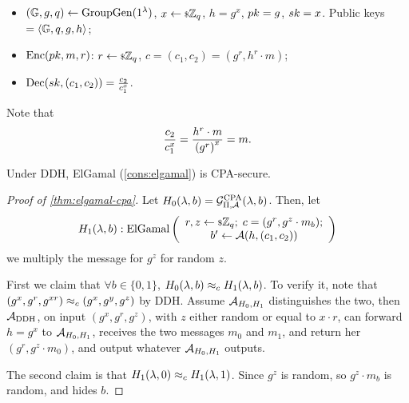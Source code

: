 \begin{construction}[ElGamal] \label{cons:elgamal}
	\begin{itemize}
		\item $(\mathbb{G} , \allowbreak g , \allowbreak q) \leftarrow \mathrm{GroupGen}(1^{\lambda})$, $x \leftarrow {\scriptstyle \$} {\mathbb{Z}_q}$, $h = g^x$, $pk = g$, $sk = x$.
			Public keys $= \left< \mathbb{G}, q, g, h \right>$;
		\item $\mathrm{Enc}(pk, m, r)$: $r \leftarrow {\scriptstyle \$} {\mathbb{Z}_q}$, $c = (c_1, c_2) = (g^r, h^r \cdot m)$;
		\item $\mathrm{Dec}(sk, (c_1, c_2)) = \frac{c_2}{c_1^x}$.
	\end{itemize}
	Note that
	\begin{equation*}
		\frac{c_2}{c_1^x} = \frac{h^r \cdot m}{\left( g^r \right)^x} = m. \qedhere
	\end{equation*}
\end{construction}

\begin{theorem} \label{thm:elgamal-cpa}
	Under \ac{DDH}, ElGamal (\cref{cons:elgamal}) is \ac{CPA}-secure.
\end{theorem}

\begin{proof}[Proof of \cref{thm:elgamal-cpa}]
	Let $H_0(\lambda, b) = \mathcal{G}_{\Pi,\mathcal{A}}^{\text{CPA}}(\lambda, b)$.
	Then, let
	\begin{equation*}
		H_1(\lambda, b) :
		\mathrm{ElGamal} \left(
			\begin{array}{c}
				r,z \leftarrow {\scriptstyle \$} {\mathbb{Z}_q}; \; c = (g^r, g^z \cdot m_b); \\
				b' \leftarrow \mathcal{A}(h, (c_1, c_2))
			\end{array}
		\right)
	\end{equation*}
	\ie we multiply the message for $g^z$ for random $z$.

	First we claim that $\forall b \in \{0,1\}$, $H_0(\lambda, b) \approx_c H_1(\lambda, b)$.
	To verify it, note that $(g^x, g^r, g^{xr}) \approx_c (g^x, g^y, g^z)$ by \ac{DDH}.
	Assume $\mathcal{A}_{H_0, H_1}$ distinguishes the two, then $\mathcal{A}_{\text{DDH}}$, on input $(g^x, g^r, g^z)$, with $z$ either random or equal to $x \cdot r$, can forward $h = g^x$ to $\mathcal{A}_{H_0,H_1}$, receives the two messages $m_0$ and $m_1$, and return her $(g^r, g^z \cdot m_0)$, and output whatever $\mathcal{A}_{H_0,H_1}$ outputs.

	The second claim is that $H_1(\lambda, 0) \approx_c H_1(\lambda, 1)$.
	Since $g^z$ is random, so $g^z \cdot m_b$ is random, and hides $b$.
\end{proof}

